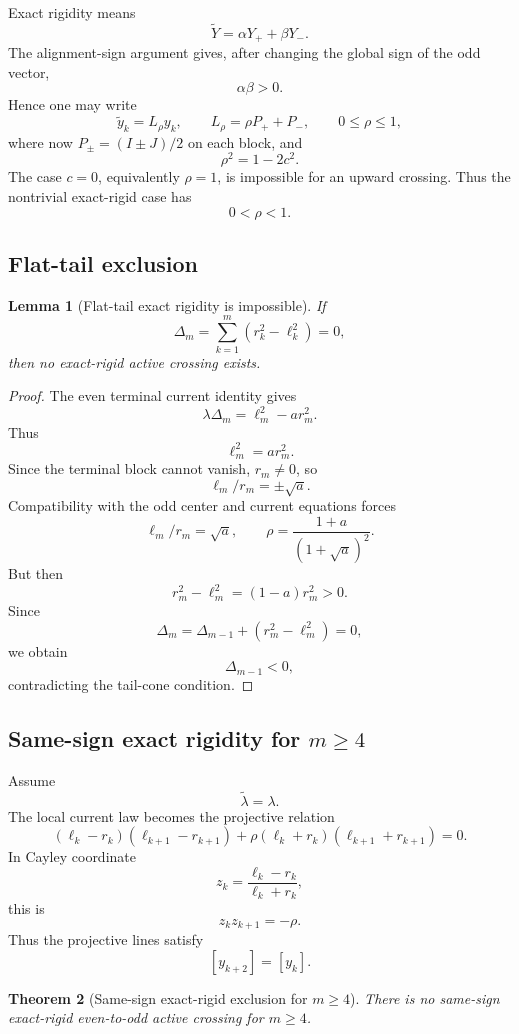 \documentclass[11pt]{article}
\numberwithin{equation}{section}
\newtheorem{theorem}{Theorem}[section]
\newtheorem{lemma}[theorem]{Lemma}
\begin{document}
Exact rigidity means
\[
\widetilde Y=\alpha Y_+ +\beta Y_-.
\]
The alignment-sign argument gives, after changing the global sign of the odd vector,
\[
\alpha\beta>0.
\]
Hence one may write
\[
\widetilde y_k=L_\rho y_k,
\qquad
L_\rho=\rho P_+ +P_-,
\qquad
0\le\rho\le1,
\]
where now \(P_\pm=(I\pm J)/2\) on each block, and
\[
\rho^2=1-2c^2.
\]
The case \(c=0\), equivalently \(\rho=1\), is impossible for an upward crossing. Thus
the nontrivial exact-rigid case has
\[
0<\rho<1.
\]

\subsection{Flat-tail exclusion}

\begin{lemma}[Flat-tail exact rigidity is impossible]
If
\[
\Delta_m=\sum_{k=1}^{m}(r_k^2-\ell_k^2)=0,
\]
then no exact-rigid active crossing exists.
\end{lemma}

\begin{proof}
The even terminal current identity gives
\[
\lambda\Delta_m=\ell_m^2-ar_m^2.
\]
Thus
\[
\ell_m^2=ar_m^2.
\]
Since the terminal block cannot vanish, \(r_m\ne0\), so
\[
\ell_m/r_m=\pm\sqrt a.
\]
Compatibility with the odd center and current equations forces
\[
\ell_m/r_m=\sqrt a,
\qquad
\rho=\frac{1+a}{(1+\sqrt a)^2}.
\]
But then
\[
r_m^2-\ell_m^2=(1-a)r_m^2>0.
\]
Since
\[
\Delta_m=\Delta_{m-1}+(r_m^2-\ell_m^2)=0,
\]
we obtain
\[
\Delta_{m-1}<0,
\]
contradicting the tail-cone condition.
\end{proof}

\subsection{\texorpdfstring{Same-sign exact rigidity for \(m\ge4\)}{Same-sign exact rigidity for m >= 4}}

Assume
\[
\widetilde\lambda=\lambda.
\]
The local current law becomes the projective relation
\[
(\ell_k-r_k)(\ell_{k+1}-r_{k+1})
+
\rho(\ell_k+r_k)(\ell_{k+1}+r_{k+1})=0.
\]
In Cayley coordinate
\[
z_k=\frac{\ell_k-r_k}{\ell_k+r_k},
\]
this is
\[
z_kz_{k+1}=-\rho.
\]
Thus the projective lines satisfy
\[
[y_{k+2}]=[y_k].
\]

\begin{theorem}[Same-sign exact-rigid exclusion for \(m\ge4\)]
\label{thm:same-sign-mge4}
There is no same-sign exact-rigid even-to-odd active crossing for \(m\ge4\).
\end{theorem}
\end{document}
